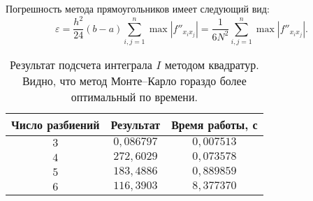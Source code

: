 Погрешность метода прямоугольников имеет следующий вид:
$$
        \varepsilon = \frac{h^2}{24}(b- a)\sum_{i,j=1}^{n}\max|f''_{x_ix_j}| = \frac{1}{6N^2}\sum_{i,j=1}^n\max|f''_{x_ix_j}|.
$$

\begin{table}[h]
\begin{center}
\begin{tabular}{|c|c|c|}
\hline
Число разбиений &
Результат  &
Время работы, с
\\
\hline
$3$
&
$0,086797$
&
$0,007513$
\\
\hline
$4$
&
$272,6029$
&
$0,073578$
\\
\hline
$5$
&
$183,4886$
&
$0,889859$
\\
\hline
$6$
&
$116,3903$
&
$8,377370$
\\
\hline
\end{tabular}
\end{center}
\caption{Результат подсчета интеграла $I$ методом квадратур. Видно, что метод Монте--Карло гораздо более оптимальный по времени.}
\end{table}
